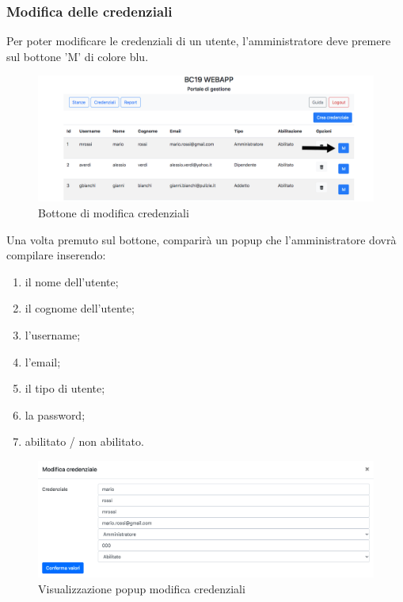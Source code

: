 \subsubsection{Modifica delle credenziali}
Per poter modificare le credenziali di un utente, l'amministratore deve premere sul bottone 'M' di colore blu.
\begin{figure}[H]
	\centering
	\includegraphics[width=15cm]{res/images/optionEdit.jpg}
	\caption{Bottone di modifica credenziali}
\end{figure}
Una volta premuto sul bottone, comparirà un popup che l'amministratore dovrà compilare inserendo:
\begin{enumerate}
	\item il nome dell'utente;
	\item il cognome dell'utente;
	\item l'username;
	\item l'email;
	\item il tipo di utente;
	\item la password;
	\item abilitato / non abilitato.
\end{enumerate}
\begin{figure}[H]
	\centering
	\includegraphics[width=15cm]{res/images/editc.jpg}
	\caption{Visualizzazione popup modifica credenziali}
\end{figure}

